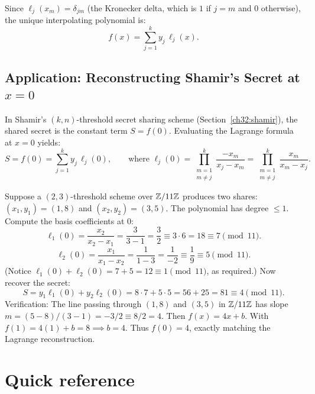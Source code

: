 Since $\ell_j(x_m) = \delta_{jm}$ (the Kronecker delta, which is $1$ if $j=m$ and $0$ otherwise), the unique interpolating polynomial is:
\[
  f(x) = \sum_{j=1}^k y_j \, \ell_j(x).
\]

\subsection{Application: Reconstructing Shamir's Secret at $x=0$}

In Shamir's $(k, n)$-threshold secret sharing scheme (Section~\ref{ch32:shamir}), the shared secret
is the constant term $S = f(0)$. Evaluating the Lagrange formula at $x = 0$ yields:
\[
  S = f(0) = \sum_{j=1}^k y_j \, \ell_j(0), \qquad \text{where } \ell_j(0) = \prod_{\substack{m=1 \\ m \ne j}}^k \frac{-x_m}{x_j - x_m} = \prod_{\substack{m=1 \\ m \ne j}}^k \frac{x_m}{x_m - x_j}.
\]

\begin{example}
\label{ch40:ex-lagrange-toy}
Suppose a $(2, 3)$-threshold scheme over $\mathbb{Z}/11\mathbb{Z}$ produces two shares: $(x_1, y_1) = (1, 8)$ and
$(x_2, y_2) = (3, 5)$. The polynomial has degree $\le 1$.
Compute the basis coefficients at $0$:
\[
  \ell_1(0) = \frac{x_2}{x_2 - x_1} = \frac{3}{3 - 1} = \frac{3}{2} \equiv 3 \cdot 6 = 18 \equiv 7 \pmod{11}.
\]
\[
  \ell_2(0) = \frac{x_1}{x_1 - x_2} = \frac{1}{1 - 3} = \frac{1}{-2} \equiv \frac{1}{9} \equiv 5 \pmod{11}.
\]
(Notice $\ell_1(0) + \ell_2(0) = 7 + 5 = 12 \equiv 1 \pmod{11}$, as required.)
Now recover the secret:
\[
  S = y_1 \ell_1(0) + y_2 \ell_2(0) = 8 \cdot 7 + 5 \cdot 5 = 56 + 25 = 81 \equiv 4 \pmod{11}.
\]
Verification: The line passing through $(1,8)$ and $(3,5)$ in $\mathbb{Z}/11\mathbb{Z}$ has slope
$m = (5-8)/(3-1) = -3/2 \equiv 8/2 = 4$. Then $f(x) = 4x + b$. With $f(1) = 4(1) + b = 8 \implies b = 4$.
Thus $f(0) = 4$, exactly matching the Lagrange reconstruction.
\end{example}

\section{Quick reference}
\label{ch40:tables}

